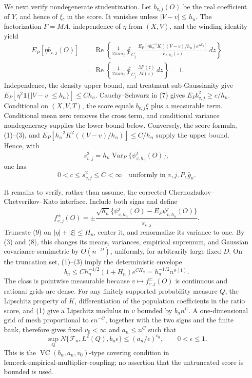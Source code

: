 We next verify nondegenerate studentization. Let \(b_{v,j}(O)\) be the real coefficient of \(Y\), and hence of \(\xi\), in the score. It vanishes unless \(|V-v|\le h_n\). The factorization \(F=MA\), independence of \(\eta\) from \((X,V)\), and the winding identity yield
\[
 \begin{aligned}
 E_P[\eta b_{v,j}(O)]
 &=\operatorname{Re}\left\{\frac1{2\pi i m_j}\oint_{C_j}
 \frac{E_P[\eta h_n^{-1}K((V-v)/h_n)e^{zZ_n}]}{F_{v,h_n}(z)}\,dz\right\}\\
 &=\operatorname{Re}\left\{\frac1{2\pi i m_j}\oint_{C_j}\frac{M'(z)}{M(z)}\,dz\right\}=1.
 \end{aligned} \tag{7}
\]
Independence, the density upper bound, and treatment sub-Gaussianity give \(E_P[\eta^2\mathbf 1\{|V-v|\le h_n\}]\le Ch_n\). Cauchy--Schwarz in (7) gives \(E_Pb_{v,j}^2\ge c/h_n\). Conditional on \((X,V,T)\), the score equals \(b_{v,j}\xi\) plus a measurable term. Conditional mean zero removes the cross term, and conditional variance nondegeneracy supplies the lower bound below. Conversely, the score formula, (1)--(3), and \(E_P[h_n^{-2}K^2((V-v)/h_n)]\le C/h_n\) supply the upper bound. Hence, with
\[
 s_{v,j}^2=h_n\operatorname{Var}_P\{\psi^j_{v,h_n}(O)\},
\]
one has
\[
 0<c\le s_{v,j}^2\le C<\infty
 \quad\text{uniformly in }v,j,P,\bar g_n. \tag{8}
\]

It remains to verify, rather than assume, the corrected Chernozhukov--Chetverikov--Kato interface. Include both signs and define
\[
 f_{v,j}^{\pm}(O)=\pm
 \frac{\sqrt{h_n}\{\psi^j_{v,h_n}(O)-E_P\psi^j_{v,h_n}(O)\}}{s_{v,j}}. \tag{9}
\]
Truncate (9) on \(|\eta|+|\xi|\le H_n\), center it, and renormalize its variance to one. By (3) and (8), this changes its means, variances, empirical supremum, and Gaussian covariance semimetric by \(O(n^{-D})\), uniformly, for arbitrarily large fixed \(D\). On the truncation set, (1)--(3) imply the deterministic envelope
\[
 b_n\le Ch_n^{-1/2}(1+H_n)e^{CH_n}
 =h_n^{-1/2}n^{o(1)}. \tag{10}
\]
The class is pointwise measurable because \(v\mapsto f_{v,j}^{\pm}(O)\) is continuous and rational grids are dense. For any finitely supported probability measure \(Q\), the Lipschitz property of \(K\), differentiation of the population coefficients in the ratio score, and (1) give a Lipschitz modulus in \(v\) bounded by \(b_nn^C\). A one-dimensional grid of mesh proportional to \(\epsilon n^{-C}\), together with the two signs and the finite bank, therefore gives fixed \(v_0<\infty\) and \(a_n\le n^C\) such that
\[
 \sup_QN\{\mathcal F_n,L^2(Q),b_n\epsilon\}
 \le(a_n/\epsilon)^{v_0},
 \qquad 0<\epsilon\le1. \tag{11}
\]
This is the \(\operatorname{VC}(b_n,a_n,v_0)\)-type covering condition in \(\text{lem:cck-empirical-multiplier-coupling}\); no assertion that the untruncated score is bounded is used.

